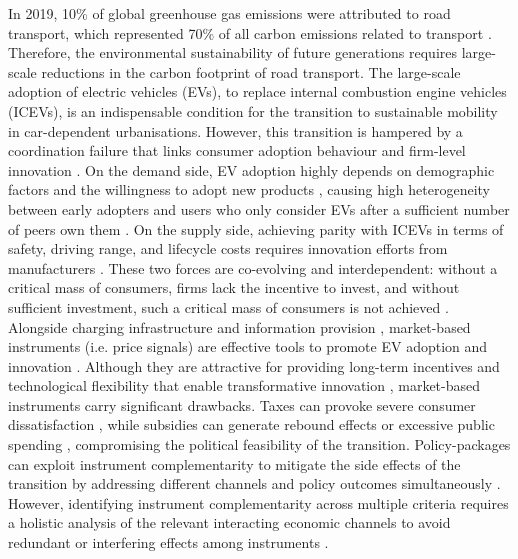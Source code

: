 \documentclass[12pt]{article}
\begin{document}
In 2019, 10\% of global greenhouse gas emissions were attributed to road transport, which represented 70\% of all carbon emissions related to transport \citep[p 1052]{ipcc2022transport}. Therefore, the environmental sustainability of future generations requires large-scale reductions in the carbon footprint of road transport. The large-scale adoption of electric vehicles (EVs), to replace internal combustion engine vehicles (ICEVs), is an indispensable condition for the transition to sustainable mobility in car-dependent urbanisations. However, this transition is hampered by a coordination failure that links consumer adoption behaviour and firm-level innovation \citep{tran_realizing_2012,vanderPloeg2025}. On the demand side, EV adoption highly depends on demographic factors and the willingness to adopt new products \citep{chen_assessing_2019,singh_review_2020}, causing high heterogeneity between early adopters and users who only consider EVs after a sufficient number of peers own them \citep{rogers2003diffusion, rasouli_influence_2016,sovacool2017experts,peng2024identifying}. On the supply side, achieving parity with ICEVs in terms of safety, driving range, and lifecycle costs requires innovation efforts from manufacturers \citep{park_understanding_2018,biresselioglu_electric_2018,neves_technological_2019,pandita2024electrifying}. These two forces are co-evolving and interdependent: without a critical mass of consumers, firms lack the incentive to invest, and without sufficient investment, such a critical mass of consumers is not achieved \citep{dijk2013incorporating,vanderPloeg2025}. Alongside charging infrastructure and information provision \citep{zhang_factors_2018,neves_technological_2019}, market-based instruments (i.e. price signals) are effective tools to promote EV adoption \citep{zhang_is_2018,pandita2024electrifying} and innovation \citep{jaffe_environmental_1997,metcalf_market-based_2009}. Although they are attractive for providing long-term incentives and technological flexibility that enable transformative innovation \citep{stavins_experience_2003,destek_market-based_2025,Gebhardt2026}, market-based instruments carry significant drawbacks. Taxes can provoke severe consumer dissatisfaction \citep{maestre-andres_perceived_2019, mayol_analysis_2025}, while subsidies can generate rebound effects \citep{langbroek_effect_2016,zhao_electric_2025,ojeda-diaz_un-intended_2026} or excessive public spending \citep{Sheldon2022Evaluating,burra_free-ridership_2024}, compromising the political feasibility of the transition. Policy-packages can exploit instrument complementarity to mitigate the side effects of the transition by addressing different channels and policy outcomes simultaneously \citep{mccollum_interaction_2018,bouma2019policy,Beiser-McGrath2023,Juntunen2026}. However, identifying instrument complementarity across multiple criteria requires a holistic analysis of the relevant interacting economic channels to avoid redundant or interfering effects among instruments  \citep{givoni_policy_2013,van2021designing,fan2025unfolding}.
\end{document}
